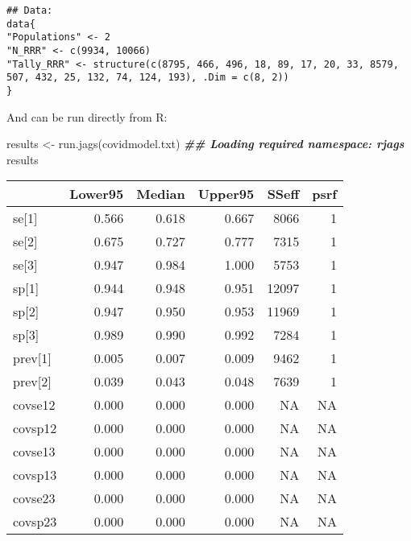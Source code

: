 \documentclass[
  ignorenonframetext,
  aspectratio=169,
]{beamer}
\newenvironment{Shaded}{\begin{snugshade}}{\end{snugshade}}
\newcommand{\DocumentationTok}[1]{\textcolor[rgb]{0.56,0.35,0.01}{\textbf{\textit{#1}}}}
\newcommand{\FunctionTok}[1]{\textcolor[rgb]{0.00,0.00,0.00}{#1}}
\newcommand{\NormalTok}[1]{#1}
\newcommand{\OtherTok}[1]{\textcolor[rgb]{0.56,0.35,0.01}{#1}}
\newcommand{\StringTok}[1]{\textcolor[rgb]{0.31,0.60,0.02}{#1}}
\begin{document}
\begin{frame}[fragile]
\scriptsize

\begin{verbatim}
## Data:
data{
"Populations" <- 2
"N_RRR" <- c(9934, 10066)
"Tally_RRR" <- structure(c(8795, 466, 496, 18, 89, 17, 20, 33, 8579, 507, 432, 25, 132, 74, 124, 193), .Dim = c(8, 2))
}
\end{verbatim}

\normalsize
\end{frame}

\begin{frame}[fragile]
And can be run directly from R:

\scriptsize

\begin{Shaded}
\begin{Highlighting}[]
\NormalTok{results }\OtherTok{\textless{}{-}} \FunctionTok{run.jags}\NormalTok{(}\StringTok{\textquotesingle{}covidmodel.txt\textquotesingle{}}\NormalTok{)}
\DocumentationTok{\#\# Loading required namespace: rjags}
\NormalTok{results}
\end{Highlighting}
\end{Shaded}

\normalsize

\scriptsize

\begin{longtable}[]{@{}lrrrrr@{}}
\toprule
& Lower95 & Median & Upper95 & SSeff & psrf \\
\midrule
\endhead
se{[}1{]} & 0.566 & 0.618 & 0.667 & 8066 & 1 \\
se{[}2{]} & 0.675 & 0.727 & 0.777 & 7315 & 1 \\
se{[}3{]} & 0.947 & 0.984 & 1.000 & 5753 & 1 \\
sp{[}1{]} & 0.944 & 0.948 & 0.951 & 12097 & 1 \\
sp{[}2{]} & 0.947 & 0.950 & 0.953 & 11969 & 1 \\
sp{[}3{]} & 0.989 & 0.990 & 0.992 & 7284 & 1 \\
prev{[}1{]} & 0.005 & 0.007 & 0.009 & 9462 & 1 \\
prev{[}2{]} & 0.039 & 0.043 & 0.048 & 7639 & 1 \\
covse12 & 0.000 & 0.000 & 0.000 & NA & NA \\
covsp12 & 0.000 & 0.000 & 0.000 & NA & NA \\
covse13 & 0.000 & 0.000 & 0.000 & NA & NA \\
covsp13 & 0.000 & 0.000 & 0.000 & NA & NA \\
covse23 & 0.000 & 0.000 & 0.000 & NA & NA \\
covsp23 & 0.000 & 0.000 & 0.000 & NA & NA \\
\bottomrule
\end{longtable}

\normalsize
\end{frame}
\end{document}
